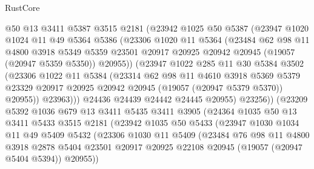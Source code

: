 \begin{lexlean}{RustCore}
\begin{coremodule}
            @50
            @13
            @3411
            @5387
            @3515
            @2181
            (@23942
              @1025
              @50
              @5387
              (@23947
                @1020
                @1024
                @11
                @49
                @5364
                @5386
                (@23306
                  @1020
                  @11
                  @5364
                  (@23484
                    @62
                    @98
                    @11
                    @4800
                    @3918
                    @5349
                    @5359
                    @23501
                    @20917
                    @20925
                    @20942
                    @20945
                    (@19057 (@20947 @5359 @5350))
                    @20955))
                (@23947
                  @1022
                  @285
                  @11
                  @30
                  @5384
                  @3502
                  (@23306
                    @1022
                    @11
                    @5384
                    (@23314
                      @62
                      @98
                      @11
                      @4610
                      @3918
                      @5369
                      @5379
                      @23329
                      @20917
                      @20925
                      @20942
                      @20945
                      (@19057 (@20947 @5379 @5370))
                      @20955))
                  @23963)))
            @24436
            @24439
            @24442
            @24445
            @20955)
          @23256))
      (@23209
        @5392
        @1036
        @679
        @13
        @3411
        @5435
        @3411
        @3905
        (@24364
          @1035
          @50
          @13
          @3411
          @5433
          @3515
          @2181
          (@23942
            @1035
            @50
            @5433
            (@23947
              @1030
              @1034
              @11
              @49
              @5409
              @5432
              (@23306
                @1030
                @11
                @5409
                (@23484
                  @76
                  @98
                  @11
                  @4800
                  @3918
                  @2878
                  @5404
                  @23501
                  @20917
                  @20925
                  @22108
                  @20945
                  (@19057 (@20947 @5404 @5394))
                  @20955))

\end{coremodule}
\end{lexlean}
